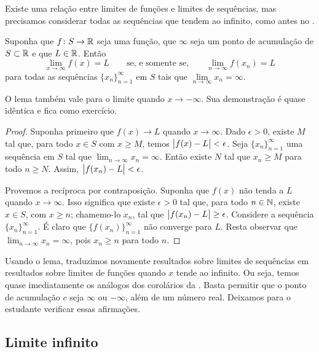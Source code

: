 Existe uma relação entre limites de funções e limites de sequências, mas precisamos considerar todas as
sequências que tendem ao infinito, como antes no .

\begin{lemma} \label{seqflimitinf:lemma}
Suponha que $f \colon S \to {\mathbb{R}}$ seja uma função, que $\infty$ seja um ponto de acumulação
de $S \subset {\mathbb{R}}$ e que $L \in {\mathbb{R}}$. Então
\begin{equation*}
\lim_{x\to\infty} f(x) = L
\qquad \text{se, e somente se,} \qquad
\lim_{n\to\infty} f(x_n) = L
\end{equation*}
para todas as sequências $\{ x_n \}_{n=1}^\infty$ em $S$ tais que $\lim\limits_{n\to\infty} x_n = \infty$.
\end{lemma}

O lema também vale para o limite quando $x \to -\infty$.
Sua demonstração é quase idêntica e
fica como exercício.

\begin{proof}
Suponha primeiro que $f(x) \to L$ quando $x \to \infty$.
Dado $\epsilon > 0$, existe $M$ tal que, para todo $x \in S$
com $x \geq M$,
temos $\bigl\lvert {f(x)-L} \bigr\rvert < \epsilon$.
Seja $\{ x_n \}_{n=1}^\infty$
uma sequência em $S$ tal que $\lim_{n\to\infty} x_n = \infty$. Então existe
$N$ tal que
$x_n \geq M$
para todo $n \geq N$.
Assim,
$\bigl\lvert {f(x_n)-L} \bigr\rvert < \epsilon$.

Provemos a recíproca por contraposição. Suponha que $f(x)$ não
tenda a $L$ quando $x \to \infty$.
Isso significa que existe $\epsilon > 0$
tal que, para todo $n \in {\mathbb{N}}$, existe $x \in S$, com $x \geq n$; chamemo-lo
$x_n$, tal que $\bigl\lvert {f(x_n)-L} \bigr\rvert \geq \epsilon$.
Considere a sequência $\{ x_n \}_{n=1}^\infty$. É claro
que $\bigl\{ f(x_n) \bigr\}_{n=1}^\infty$ não converge para $L$. Resta observar
que $\lim_{n\to\infty} x_n = \infty$, pois $x_n \geq n$ para todo $n$.
\end{proof}

Usando o lema, traduzimos novamente resultados sobre limites de sequências
em resultados sobre limites de funções quando $x$ tende ao infinito. Ou seja,
temos quase imediatamente os análogos dos corolários
da . Basta permitir
que o ponto de acumulação $c$ seja $\infty$ ou $-\infty$,
além de um número real. Deixamos para
o estudante verificar essas afirmações.

\subsection{Limite infinito}

